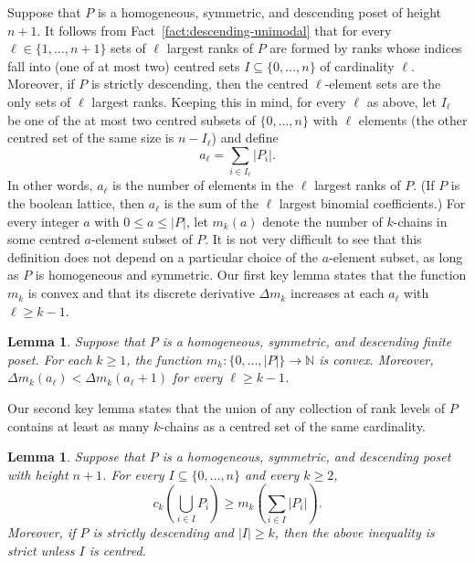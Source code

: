 \documentclass[11pt,a4paper,reqno]{amsart}
\newtheorem{lemma}[thm]{Lemma}
\numberwithin{claim}{thm}
\theoremstyle{definition}
\newcommand{\Nat}{\mathbb{N}}
\renewcommand{\le}{\leqslant}
\renewcommand{\ge}{\geqslant}
\begin{document}
Suppose that $P$ is a homogeneous, symmetric, and descending poset of height $n+1$. It follows from Fact~\ref{fact:descending-unimodal} that for every $\ell \in \{1, \dotsc, n+1\}$ sets of $\ell$ largest ranks of $P$ are formed by ranks whose indices fall into (one of at most two) centred sets $I \subseteq \{0, \dotsc, n\}$ of cardinality $\ell$. Moreover, if $P$ is strictly descending, then the centred $\ell$-element sets are the only sets of $\ell$ largest ranks. Keeping this in mind, for every $\ell$ as above, let $I_\ell$ be one of the at most two centred subsets of $\{0, \dotsc, n\}$ with $\ell$ elements (the other centred set of the same size is $n - I_\ell$) and define
\[
  a_\ell = \sum_{i \in I_\ell} |P_i|.
\]
In other words, $a_\ell$ is the number of elements in the $\ell$ largest ranks of $P$. (If $P$ is the boolean lattice, then $a_\ell$ is the sum of the $\ell$ largest binomial coefficients.) For every integer $a$ with $0 \le a \le |P|$, let $m_k(a)$ denote the number of $k$-chains in some centred $a$-element subset of $P$. It is not very difficult to see that this definition does not depend on a particular choice of the $a$-element subset, as long as $P$ is homogeneous and symmetric. Our first key lemma states that the function $m_k$ is convex and that its discrete derivative $\Delta m_k$ increases at each $a_\ell$ with $\ell \ge k-1$.

\begin{lemma}
  \label{lemma:mk-convex}
  Suppose that $P$ is a homogeneous, symmetric, and descending finite poset. For each $k \ge 1$, the function $m_k \colon \{0, \dotsc, |P|\} \to \Nat$ is convex. Moreover, $\Delta m_k(a_\ell) < \Delta m_k(a_\ell+1)$ for every $\ell \ge k-1$.
\end{lemma}

Our second key lemma states that the union of any collection of rank levels of $P$ contains at least as many $k$-chains as a centred set of the same cardinality.

\begin{lemma}
  \label{lemma:main}
  Suppose that $P$ is a homogeneous, symmetric, and descending poset with height $n+1$. For every $I \subseteq \{0, \dotsc, n\}$ and every $k \ge 2$,
  \[
    c_k\left( \bigcup_{i \in I} P_i \right) \ge m_k\left( \sum_{i \in I} |P_i| \right).
  \]
  Moreover, if $P$ is strictly descending and $|I| \ge k$, then the above inequality is strict unless $I$ is centred.
\end{lemma}
\end{document}
